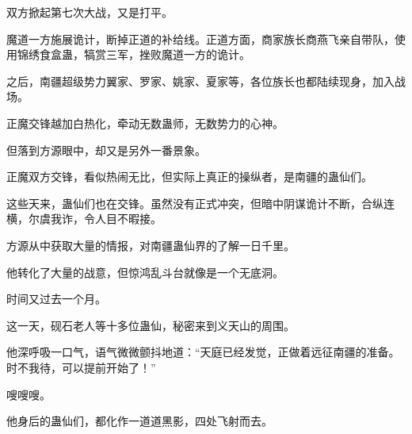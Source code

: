 \begin{this_body}
双方掀起第七次大战，又是打平。

魔道一方施展诡计，断掉正道的补给线。正道方面，商家族长商燕飞亲自带队，使用锦绣食盒蛊，犒赏三军，挫败魔道一方的诡计。

之后，南疆超级势力翼家、罗家、姚家、夏家等，各位族长也都陆续现身，加入战场。

正魔交锋越加白热化，牵动无数蛊师，无数势力的心神。

但落到方源眼中，却又是另外一番景象。

正魔双方交锋，看似热闹无比，但实际上真正的操纵者，是南疆的蛊仙们。

这些天来，蛊仙们也在交锋。虽然没有正式冲突，但暗中阴谋诡计不断，合纵连横，尔虞我诈，令人目不暇接。

方源从中获取大量的情报，对南疆蛊仙界的了解一日千里。

他转化了大量的战意，但惊鸿乱斗台就像是一个无底洞。

时间又过去一个月。

这一天，砚石老人等十多位蛊仙，秘密来到义天山的周围。

他深呼吸一口气，语气微微颤抖地道：“天庭已经发觉，正做着远征南疆的准备。时不我待，可以提前开始了！”

嗖嗖嗖。

他身后的蛊仙们，都化作一道道黑影，四处飞射而去。

\end{this_body}

